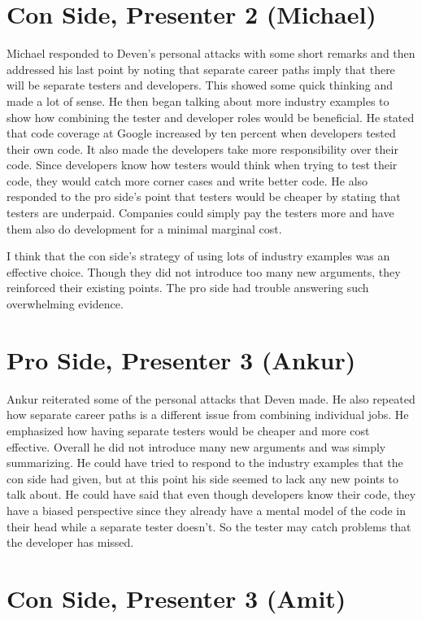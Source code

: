 \documentclass[letterpaper,twocolumn,10pt]{article}
\begin{document}
\section{Con Side, Presenter 2 (Michael)}

Michael responded to Deven's personal attacks with some short remarks and then addressed his last point by noting that
separate career paths imply that there will be separate testers and developers. This showed some quick thinking and made
a lot of sense. He then began talking about more industry examples to show how combining the tester and developer roles
would be beneficial. He stated that code coverage at Google increased by ten percent when developers tested their own code.
It also made the developers take more responsibility over their code. Since developers know how testers would think when
trying to test their code, they would catch more corner cases and write better code. He also responded to the pro side's
point that testers would be cheaper by stating that testers are underpaid. Companies could simply pay the testers more
and have them also do development for a minimal marginal cost.

I think that the con side's strategy of using lots of industry examples was an effective choice. Though they did not
introduce too many new arguments, they reinforced their existing points. The pro side had trouble answering such
overwhelming evidence.

\section{Pro Side, Presenter 3 (Ankur)}

Ankur reiterated some of the personal attacks that Deven made. He also repeated how separate career paths is a
different issue from combining individual jobs. He emphasized how having separate testers would be cheaper
and more cost effective. Overall he did not introduce many new arguments and was simply summarizing. He could
have tried to respond to the industry examples that the con side had given, but at this point his side seemed to lack
any new points to talk about. He could have said that even though developers know their code, they have a biased perspective
since they already have a mental model of the code in their head while a separate tester doesn't. So the tester may catch
problems that the developer has missed.

\section{Con Side, Presenter 3 (Amit)}
\end{document}
